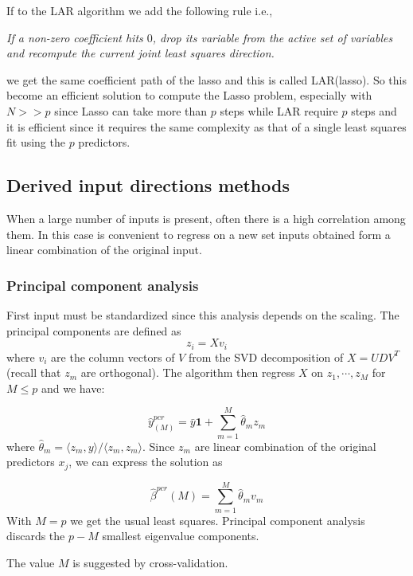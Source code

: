 \documentclass[12pt, letterpaper]{article}
\theoremstyle{definition}
\begin{document}
If to the LAR algorithm we add the following rule i.e.,

\textit{If a non-zero coefficient hits $0$, drop its variable from the active set of variables and recompute the current joint least squares direction.}

we get the same coefficient path of the lasso and this is called LAR(lasso). So this become an efficient solution to compute the Lasso problem, especially with $N>>p$ since Lasso can take more than $p$ steps while LAR require $p$ steps and it is efficient since it requires the same complexity as that of a single least squares fit using the $p$ predictors.

\subsection{Derived input directions methods}
When a large number of inputs is present, often there is a high correlation among them. In this case is convenient to regress on a new set inputs obtained form a linear combination of the original input.

\subsubsection{Principal component analysis}
First input must be standardized since this analysis depends on the scaling. The principal components are defined as  	
\begin{equation}
z_i = X v_i
\end{equation}
where $v_i$ are the column vectors of $V$ from the SVD decomposition of $X=UDV^T$ (recall that $z_m$ are orthogonal). The algorithm then regress $X$ on $z_1,\cdots, z_M$ for $M\le p$ and we have:

\begin{equation}
\hat{y}^{pcr}_{(M)} = \bar{y}\mathbf{1} + \sum_{m=1}^M \hat{\theta}_m z_m
\end{equation}
where $\hat{\theta}_m = \langle z_m, y\rangle/\langle z_m, z_m \rangle$. Since $z_m$ are linear combination of the original predictors $x_j$, we can express the solution as 

\begin{equation}
\hat{\beta}^{pcr}(M) = \sum_{m=1}^{M} \hat{\theta}_m v_m
\end{equation}
With $M=p$ we get the usual least squares. Principal component analysis discards the $p-M$ smallest eigenvalue components.

The value $M$ is suggested by cross-validation.
\end{document}
